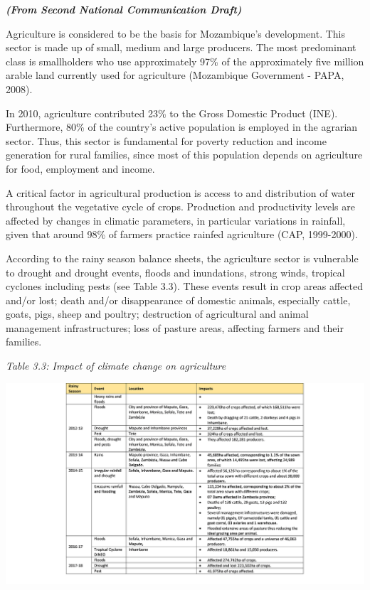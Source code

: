 \documentclass[
]{book}
\begin{document}
\textbf{\emph{(From Second National Communication Draft)}}

Agriculture is considered to be the basis for Mozambique's development. This sector is made up of small, medium and large producers. The most predominant class is smallholders who use approximately 97\% of the approximately five million arable land currently used for agriculture (Mozambique Government - PAPA, 2008).

In 2010, agriculture contributed 23\% to the Gross Domestic Product (INE). Furthermore, 80\% of the country's active population is employed in the agrarian sector. Thus, this sector is fundamental for poverty reduction and income generation for rural families, since most of this population depends on agriculture for food, employment and income.

A critical factor in agricultural production is access to and distribution of water throughout the vegetative cycle of crops. Production and productivity levels are affected by changes in climatic parameters, in particular variations in rainfall, given that around 98\% of farmers practice rainfed agriculture (CAP, 1999-2000).

According to the rainy season balance sheets, the agriculture sector is vulnerable to drought and drought events, floods and inundations, strong winds, tropical cyclones including pests (see Table 3.3). These events result in crop areas affected and/or lost; death and/or disappearance of domestic animals, especially cattle, goats, pigs, sheep and poultry; destruction of agricultural and animal management infrastructures; loss of pasture areas, affecting farmers and their families.

\emph{Table 3.3: Impact of climate change on agriculture}

\includegraphics[width=1.5\textwidth,height=\textheight]{Agriculture-impact.png}
\end{document}
